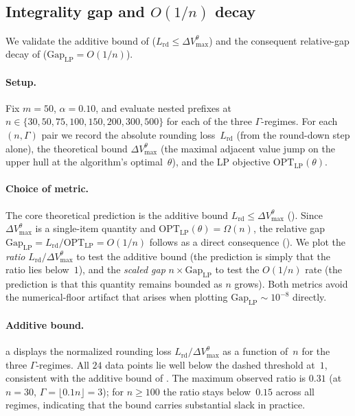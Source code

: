 \documentclass[11pt, a4paper]{article}
\theoremstyle{plain}
\theoremstyle{definition}
\theoremstyle{remark}
\begin{document}
\subsection{Integrality gap and \texorpdfstring{\(O(1/n)\)}{O(1/n)} decay}%
\label{subsec:numerics_gap}

We validate the additive bound of 
($L_{\mathrm{rd}}\le\Delta V_{\max}^\theta$) and the consequent relative-gap decay of
 ($\mathrm{Gap}_{\mathrm{LP}}=O(1/n)$).

\paragraph{Setup.}
Fix $m=50$, $\alpha=0.10$, and evaluate nested prefixes at
$n\in\{30,50,75,100,150,200,300,500\}$ for each of the three $\Gamma$-regimes.
For each $(n,\Gamma)$ pair we record
the absolute rounding loss~$L_{\mathrm{rd}}$ (from the round-down step alone),
the theoretical bound $\Delta V_{\max}^\theta$ (the maximal adjacent value jump on the upper
hull at the algorithm's optimal~$\theta$), and the LP objective
$\mathrm{OPT}_{\mathrm{LP}}(\theta)$.

\paragraph{Choice of metric.}
The core theoretical prediction is the additive bound
$L_{\mathrm{rd}}\le\Delta V_{\max}^\theta$
(). Since $\Delta V_{\max}^\theta$ is a single-item
quantity and $\mathrm{OPT}_{\mathrm{LP}}(\theta)=\Omega(n)$, the relative gap
$\mathrm{Gap}_{\mathrm{LP}}=L_{\mathrm{rd}}/\mathrm{OPT}_{\mathrm{LP}}=O(1/n)$ follows as a
direct consequence ().
We plot the \emph{ratio} $L_{\mathrm{rd}}/\Delta V_{\max}^\theta$ to test the additive bound
(the prediction is simply that the ratio lies below~$1$), and the \emph{scaled gap}
$n\times\mathrm{Gap}_{\mathrm{LP}}$ to test the \(O(1/n)\) rate (the prediction is that this
quantity remains bounded as $n$ grows).
Both metrics avoid the numerical-floor artifact that arises when plotting
$\mathrm{Gap}_{\mathrm{LP}}\sim10^{-8}$ directly.

\paragraph{Additive bound.}
a displays the normalized rounding loss
$L_{\mathrm{rd}}/\Delta V_{\max}^\theta$ as a function of~$n$ for the three $\Gamma$-regimes.
All $24$ data points lie well below the dashed threshold at~$1$, consistent with the
additive bound of . The maximum observed ratio is $0.31$
(at $n=30$, $\Gamma=\lfloor0.1n\rfloor=3$); for $n\ge100$ the ratio stays below~$0.15$ across
all regimes, indicating that the bound carries substantial slack in practice.
\end{document}
